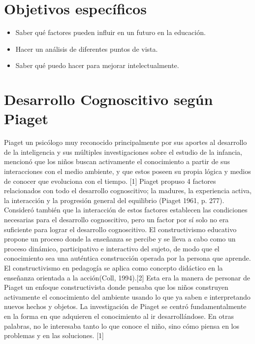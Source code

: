 \documentclass{bmcart}
\begin{document}
\section{Objetivos específicos}
\begin{itemize}
\item Saber qué factores pueden influir en un futuro en la educación.
\newline 
\item Hacer un análisis de diferentes puntos de vista.
\newline 
\item Saber qué puedo hacer para mejorar intelectualmente.
	\end{itemize}

\newpage
\section{Desarrollo Cognoscitivo según Piaget}
Piaget un psicólogo muy reconocido principalmente por sus aportes al desarrollo de la inteligencia y sus múltiples investigaciones sobre el estudio de la infancia, mencionó que los niños buscan activamente el conocimiento a partir de sus interacciones con el medio ambiente,  y que estos poseen su propia lógica y medios de conocer que evoluciona con el tiempo. [1] 
\newline
\newline
Piaget propuso 4 factores relacionados con todo el desarrollo cognoscitivo; la madures, la experiencia activa, la interacción y la progresión general del equilibrio (Piaget 1961, p. 277). Consideró también que la interacción de estos factores establecen las condiciones necesarias para el desarrollo cognoscitivo, pero un factor por sí solo no era suficiente para lograr el desarrollo cognoscitivo.
\newline
\newline
El constructivismo educativo propone un proceso donde la enseñanza se percibe y se lleva a cabo como un proceso dinámico, participativo e interactivo del sujeto, de modo que el conocimiento sea una auténtica construcción operada por la persona que aprende. El constructivismo en pedagogía se aplica como concepto didáctico en la enseñanza orientada a la acción(Coll, 1994).[2]
\newline
\newline
Esta era la manera de personar de Piaget un enfoque constructivista donde pensaba que  los niños  construyen  activamente el  conocimiento  del  ambiente usando lo  que  ya  saben  e  interpretando  nuevos  hechos y  objetos.  La  investigación  de Piaget se  centró  fundamentalmente  en  la  forma  en  que  adquieren  el  conocimiento  al  ir desarrollándose. En otras palabras, no le interesaba tanto lo que conoce el niño, sino cómo piensa  en  los  problemas  y  en  las  soluciones. [1]
\end{document}
